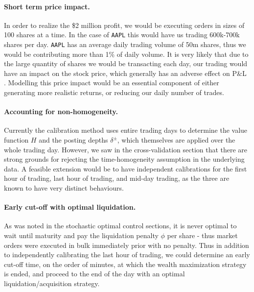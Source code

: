 \paragraph{Short term price impact.} In order to realize the \$2 million profit, we would be executing orders in sizes of 100 shares at a time. In the case of \texttt{AAPL} this would have us trading 600k-700k shares per day. \texttt{AAPL} has an average daily trading volume of 50m shares, thus we would be contributing more than 1\% of daily volume. It is very likely that due to the large quantity of shares we would be transacting each day, our trading would have an impact on the stock price, which generally has an adverse effect on P\&L \citep{almgren2003optimal}. Modelling this price impact would be an essential component of either generating more realistic returns, or reducing our daily number of trades.

\paragraph{Accounting for non-homogeneity.} Currently the calibration method uses entire trading days to determine the value function $H$ and the posting depths $\delta^\pm$, which themselves are applied over the whole trading day. However, we saw in the cross-validation section that there are strong grounds for rejecting the time-homogeneity assumption in the underlying data. A feasible extension would be to have independent calibrations for the first hour of trading, last hour of trading, and mid-day trading, as the three are known to have very distinct behaviours. 

\paragraph{Early cut-off with optimal liquidation.} As was noted in the stochastic optimal control sections, it is never optimal to wait until maturity and pay the liquidation penalty $\phi$ per share - thus market orders were executed in bulk immediately prior with no penalty. Thus in addition to independently calibrating the last hour of trading, we could determine an early cut-off time, on the order of minutes, at which the wealth maximization strategy is ended, and proceed to the end of the day with an optimal liquidation/acquisition strategy. 

